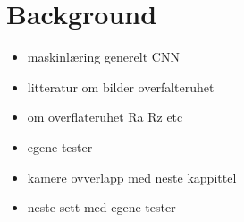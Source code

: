 \chapter{Background}

\begin{itemize}
    \item maskinlæring generelt CNN
    \item litteratur om bilder overfalteruhet
    \item om overflateruhet Ra Rz etc 
    \item egene tester
    \item kamere ovverlapp med neste kappittel
    \item neste sett med egene tester
\end{itemize}


